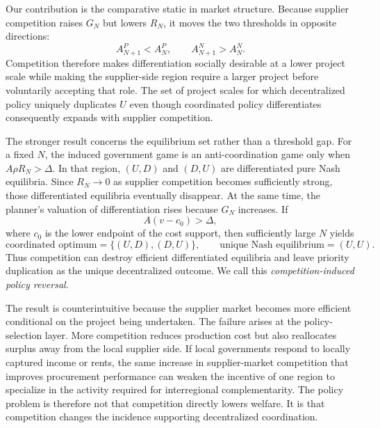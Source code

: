 Our contribution is the comparative static in market structure. Because supplier competition raises $G_N$ but lowers $R_N$, it moves the two thresholds in opposite directions:
\begin{equation}
A_{N+1}^P<A_N^P,
\qquad
A_{N+1}^N>A_N^N.
\label{eq:intro-divergence}
\end{equation}
Competition therefore makes differentiation socially desirable at a lower project scale while making the supplier-side region require a larger project before voluntarily accepting that role. The set of project scales for which decentralized policy uniquely duplicates $U$ even though coordinated policy differentiates consequently expands with supplier competition.

The stronger result concerns the equilibrium set rather than a threshold gap. For a fixed $N$, the induced government game is an anti-coordination game only when $A\rho R_N>\Delta$. In that region, $(U,D)$ and $(D,U)$ are differentiated pure Nash equilibria. Since $R_N\to0$ as supplier competition becomes sufficiently strong, those differentiated equilibria eventually disappear. At the same time, the planner's valuation of differentiation rises because $G_N$ increases. If
\begin{equation}
A(v-c_0)>\Delta,
\label{eq:intro-limit-condition}
\end{equation}
where $c_0$ is the lower endpoint of the cost support, then sufficiently large $N$ yields
\begin{equation}
\text{coordinated optimum}=\{(U,D),(D,U)\},
\qquad
\text{unique Nash equilibrium}=(U,U).
\label{eq:intro-reversal}
\end{equation}
Thus competition can destroy efficient differentiated equilibria and leave priority duplication as the unique decentralized outcome. We call this \emph{competition-induced policy reversal}.

The result is counterintuitive because the supplier market becomes more efficient conditional on the project being undertaken. The failure arises at the policy-selection layer. More competition reduces production cost but also reallocates surplus away from the local supplier side. If local governments respond to locally captured income or rents, the same increase in supplier-market competition that improves procurement performance can weaken the incentive of one region to specialize in the activity required for interregional complementarity. The policy problem is therefore not that competition directly lowers welfare. It is that competition changes the incidence supporting decentralized coordination.

